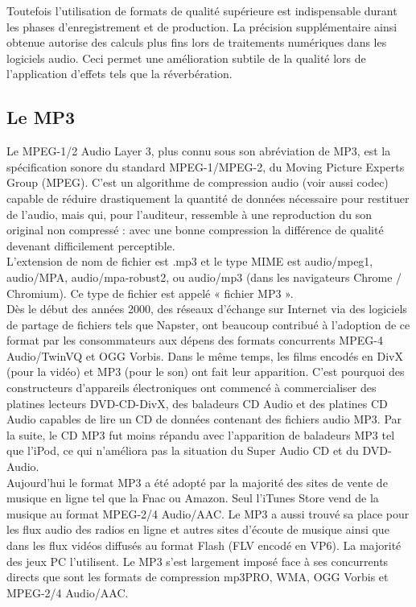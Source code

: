 \documentclass[12pt,a4paper]{report}
\begin{document}
Toutefois l'utilisation de formats de qualité supérieure est indispensable durant les phases d'enregistrement et de production. La précision supplémentaire ainsi obtenue autorise des calculs plus fins lors de traitements numériques dans les logiciels audio. Ceci permet une amélioration subtile de la qualité lors de l'application d'effets tels que la réverbération.\\

\subsection{Le MP3}

Le MPEG-1/2 Audio Layer 3, plus connu sous son abréviation de MP3, est la spécification sonore du standard MPEG-1/MPEG-2, du Moving Picture Experts Group (MPEG). C'est un algorithme de compression audio (voir aussi codec) capable de réduire drastiquement la quantité de données nécessaire pour restituer de l'audio, mais qui, pour l'auditeur, ressemble à une reproduction du son original non compressé : avec une bonne compression la différence de qualité devenant difficilement perceptible.\\

L'extension de nom de fichier est .mp3 et le type MIME est audio/mpeg1, audio/MPA, audio/mpa-robust2, ou audio/mp3 (dans les navigateurs Chrome / Chromium). Ce type de fichier est appelé « fichier MP3 ».\\

Dès le début des années 2000, des réseaux d'échange sur Internet via des logiciels de partage de fichiers tels que Napster, ont beaucoup contribué à l'adoption de ce format par les consommateurs aux dépens des formats concurrents MPEG-4 Audio/TwinVQ et OGG Vorbis. Dans le même temps, les films encodés en DivX (pour la vidéo) et MP3 (pour le son) ont fait leur apparition. C'est pourquoi des constructeurs d'appareils électroniques ont commencé à commercialiser des platines lecteurs DVD-CD-DivX, des baladeurs CD Audio et des platines CD Audio capables de lire un CD de données contenant des fichiers audio MP3. Par la suite, le CD MP3 fut moins répandu avec l'apparition de baladeurs MP3 tel que l'iPod, ce qui n'améliora pas la situation du Super Audio CD et du DVD-Audio.\\

Aujourd'hui le format MP3 a été adopté par la majorité des sites de vente de musique en ligne tel que la Fnac ou Amazon. Seul l'iTunes Store vend de la musique au format MPEG-2/4 Audio/AAC. Le MP3 a aussi trouvé sa place pour les flux audio des radios en ligne et autres sites d'écoute de musique ainsi que dans les flux vidéos diffusés au format Flash (FLV encodé en VP6). La majorité des jeux PC l'utilisent. Le MP3 s'est largement imposé face à ses concurrents directs que sont les formats de compression mp3PRO, WMA, OGG Vorbis et MPEG-2/4 Audio/AAC.\\
\end{document}
